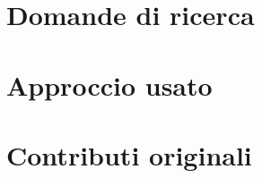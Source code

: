 
\section{Domande di ricerca}

%
%

\section{Approccio usato}

%
%

\section{Contributi originali}

